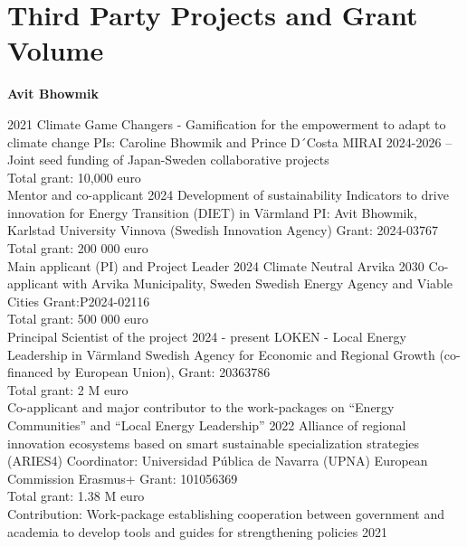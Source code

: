 \documentclass[]{friggeri-cv} %
\begin{document}
\section{Third Party Projects and Grant Volume}
\textbf{Avit Bhowmik}\\

\begin{entrylist}
\entry
{\small{2021}}
{Climate Game Changers - Gamification for the empowerment to adapt to climate change}
{PIs: Caroline Bhowmik and Prince D´Costa}
{MIRAI 2024-2026 – Joint seed funding of Japan-Sweden collaborative projects\\
Total grant: 10,000 euro\\
Mentor and co-applicant}
\entry
{\small{2024}}
{Development of sustainability Indicators to drive innovation for Energy Transition (DIET) in Värmland}
{PI: Avit Bhowmik, Karlstad University}
{Vinnova (Swedish Innovation Agency) Grant: 2024-03767\\
Total grant: 200 000 euro\\
Main applicant (PI) and Project Leader}
\entry
{\small{2024}}
{Climate Neutral Arvika 2030}
{Co-applicant with Arvika Municipality, Sweden}
{Swedish Energy Agency and Viable Cities Grant:P2024-02116 \\
Total grant: 500 000 euro\\
Principal Scientist of the project}
\entry
{\small{2024 - present}}
{LOKEN - Local Energy Leadership in Värmland}
{}
{Swedish Agency for Economic and Regional Growth (co-financed by European Union), Grant: 20363786\\
Total grant: 2 M euro\\
Co-applicant and major contributor to the work-packages on ``Energy Communities'' and ``Local Energy Leadership''}
\entry
{\small{2022}}
{Alliance of regional innovation ecosystems based on smart sustainable specialization strategies (ARIES4)}
{Coordinator: Universidad Pública de Navarra (UPNA)}
{European Commission Erasmus+ Grant: 101056369\\
Total grant: 1.38 M euro\\
Contribution: Work-package establishing cooperation between government and academia to develop tools and guides for strengthening policies}
\entry
{\small{2021}}

\end{entrylist}
\end{document}
